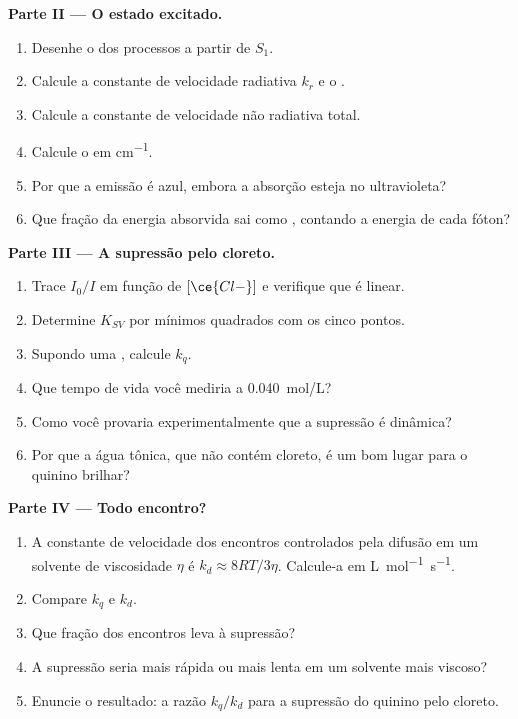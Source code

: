 \begin{problem}
\medskip\noindent\textbf{Parte II --- O estado excitado.}
\begin{enumerate}[resume]
  \item Desenhe o  dos processos a partir de $S_1$.
  \item Calcule a constante de velocidade radiativa $k_r$ e o .
  \item Calcule a constante de velocidade não radiativa total.
  \item Calcule o  em \unit{cm^{-1}}.
  \item Por que a emissão é azul, embora a absorção esteja no ultravioleta?
  \item Que fração da energia absorvida sai como , contando
        a energia de cada fóton?
\end{enumerate}

\medskip\noindent\textbf{Parte III --- A supressão pelo cloreto.}
\begin{enumerate}[resume]
  \item Trace $I_0/I$ em função de $[\ce{Cl-}]$ e verifique que é linear.
  \item Determine $K_{SV}$ por mínimos quadrados com os cinco pontos.
  \item Supondo uma , calcule $k_q$.
  \item Que tempo de vida você mediria a \qty{0.040}{mol/L}?
  \item Como você provaria experimentalmente que a supressão é dinâmica?
  \item Por que a água tônica, que não contém cloreto, é um bom lugar para o
        quinino brilhar?
\end{enumerate}

\medskip\noindent\textbf{Parte IV --- Todo encontro?}
\begin{enumerate}[resume]
  \item A constante de velocidade dos encontros controlados pela difusão em um
        solvente de viscosidade $\eta$ é $k_d \approx 8RT/3\eta$. Calcule-a em \unit{L.mol^{-1}.s^{-1}}.
  \item Compare $k_q$ e $k_d$.
  \item Que fração dos encontros leva à supressão?
  \item A supressão seria mais rápida ou mais lenta em um solvente mais viscoso?
  \item Enuncie o resultado: a razão $k_q/k_d$ para a supressão do quinino pelo
        cloreto.
\end{enumerate}
\end{problem}
